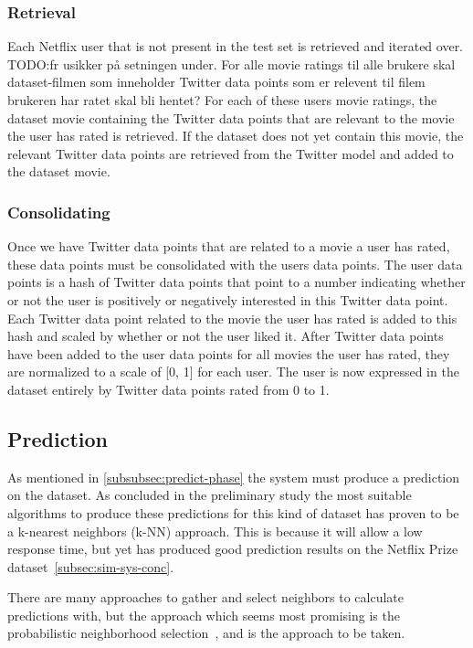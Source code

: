\subsubsection{Retrieval}
    Each Netflix user that is not present in the test set is retrieved and iterated over.
    TODO:fr usikker på setningen under.
    For alle movie ratings til alle brukere skal dataset-filmen som inneholder Twitter data points som er relevent til filem brukeren har ratet skal bli hentet?
    For each of these users movie ratings, the dataset movie containing the Twitter data points that are relevant to the movie the user has rated is retrieved.
    If the dataset does not yet contain this movie, the relevant Twitter data points are retrieved from the Twitter model and added to the dataset movie.

\subsubsection{Consolidating}
	Once we have Twitter data points that are related to a movie a user has rated, these data points must be consolidated with the users data points. The user data points is a hash of Twitter data points that point to a number indicating whether or not the user is positively or negatively interested in this Twitter data point. Each Twitter data point related to the movie the user has rated is added to this hash and scaled by whether or not the user liked it. After Twitter data points have been added to the user data points for all movies the user has rated, they are normalized to a scale of [0, 1] for each user. The user is now expressed in the dataset entirely by Twitter data points rated from 0 to 1.

\subsection{Prediction}\label{algorithm-design:prediction}
As mentioned in \ref{subsubsec:predict-phase} the system must produce a prediction on the dataset. As concluded in the preliminary study the most suitable algorithms to produce these predictions for this kind of dataset has proven to be a k-nearest neighbors (k-NN) approach. This is because it will allow a low response time, but yet has produced good prediction results on the Netflix Prize dataset~\ref{subsec:sim-sys-conc}.

There are many approaches to gather and select neighbors to calculate predictions with, but the approach which seems most promising is the probabilistic neighborhood selection~\cite{probcobfilter}, and is the approach to be taken.

